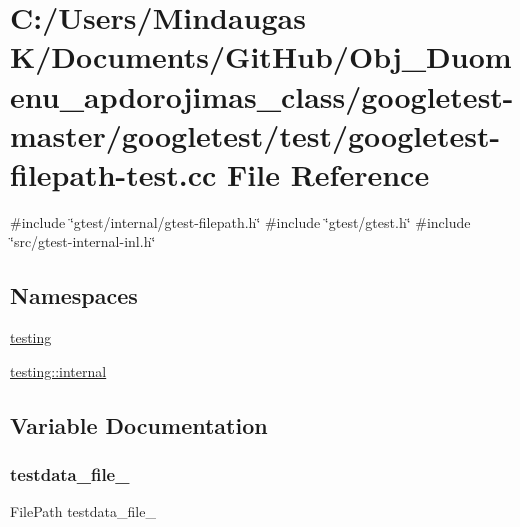 \hypertarget{googletest-master_2googletest_2test_2googletest-filepath-test_8cc}{}\section{C\+:/\+Users/\+Mindaugas K/\+Documents/\+Git\+Hub/\+Obj\+\_\+\+Duomenu\+\_\+apdorojimas\+\_\+class/googletest-\/master/googletest/test/googletest-\/filepath-\/test.cc File Reference}
\label{googletest-master_2googletest_2test_2googletest-filepath-test_8cc}
{\ttfamily \#include \char`\"{}gtest/internal/gtest-\/filepath.\+h\char`\"{}}\newline
{\ttfamily \#include \char`\"{}gtest/gtest.\+h\char`\"{}}\newline
{\ttfamily \#include \char`\"{}src/gtest-\/internal-\/inl.\+h\char`\"{}}\newline
\subsection*{Namespaces}
\begin{DoxyCompactItemize}
\item 
 \mbox{\hyperlink{namespacetesting}{testing}}
\item 
 \mbox{\hyperlink{namespacetesting_1_1internal}{testing\+::internal}}
\end{DoxyCompactItemize}


\subsection{Variable Documentation}
\mbox{\label{googletest-master_2googletest_2test_2googletest-filepath-test_8cc_ab25205b360de0f1648175ccbc1cc4365}} 
\subsubsection{\texorpdfstring{testdata\_file\_}{testdata\_file\_}}
{\footnotesize\ttfamily File\+Path testdata\+\_\+file\+\_\+\hspace{0.3cm}{\ttfamily [protected]}}

